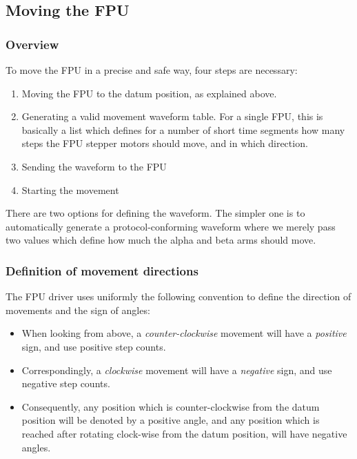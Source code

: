 \documentclass[11pt,a4paper]{scrartcl}
\begin{document}
\subsection{Moving the FPU}
\subsubsection{Overview}
To move the FPU in a precise and safe way, four steps are necessary:

\begin{enumerate}
\item Moving the FPU to the datum position, as explained above.

\item Generating a valid movement waveform table. For a single FPU,
  this is basically a list which defines for a number of short time
  segments how many steps the FPU stepper motors should move, and in
  which direction.

\item Sending the waveform to the FPU
\item Starting the movement
  
\end{enumerate}

There are two options for defining the waveform. The simpler one is to
automatically generate a protocol-conforming waveform where we merely
pass two values which define how much the alpha and beta arms should
move.

\subsubsection{Definition of movement directions}

The FPU driver uses uniformly the following convention
to define the direction of movements and the sign of
angles:

\begin{itemize}
  \item When looking from above, a \emph{counter-clockwise} movement
    will have a \emph{positive} sign, and use positive step counts.
  \item Correspondingly, a \emph{clockwise} movement will have a
    \emph{negative} sign, and use negative step counts.
  \item Consequently, any position which is counter-clockwise from the
    datum position will be denoted by a positive angle, and any
    position which is reached after rotating clock-wise from the datum
    position, will have negative angles.
\end{itemize}
\end{document}
